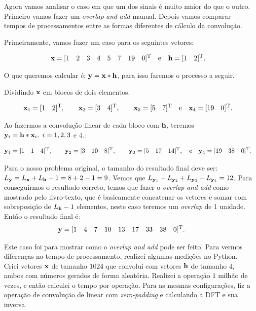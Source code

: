 \documentclass{homeworkclass}
\begin{document}
\begin{homeworkProblem}
	Agora vamos analisar o caso em que um dos sinais é muito maior do que o outro. Primeiro vamos fazer um \textit{overlap and add} manual. Depois vamos comparar tempos de processamentos entre as formas diferentes de cálculo da convolução.
	
	Primeiramente, vamos fazer um caso para os seguintes vetores:
	
	\begin{equation*}
		\mathbf{x} = [1 \quad 2 \quad 3 \quad 4 \quad 5 \quad 7 \quad 19 \quad 0]^{\mathrm{T}} \quad \textrm{e} \quad
		\mathbf{h} = [1 \quad 2]^{\mathrm{T}}.
	\end{equation*}

    O que queremos calcular é: $\mathbf{y} = \mathbf{x} * \mathbf{h}$, para isso faremos o processo a seguir.
	
	Dividindo $\mathbf{x}$ em blocos de dois elementos.
	
	\begin{equation*}
		\mathbf{x}_1 = [1 \quad 2]^{\mathrm{T}}, \qquad
		\mathbf{x}_2 = [3 \quad 4]^{\mathrm{T}}, \qquad
		\mathbf{x}_3 = [5 \quad 7]^{\mathrm{T}} \quad \textrm{e} \quad
		\mathbf{x}_4 = [19 \quad 0]^{\mathrm{T}}.
	\end{equation*}
	
	Ao fazermos a convolução linear de cada bloco com $\mathbf{h}$, teremos $\mathbf{y}_{i} = \mathbf{h} * \mathbf{x}_{i},~i = 1, 2, 3$ e $4$.:
	
		\begin{equation*}
		\mathbf{y}_1 = [1 \quad 1 \quad 4]^{\mathrm{T}}, \qquad
		\mathbf{y}_2 = [3 \quad 10 \quad 8]^{\mathrm{T}}, \qquad
		\mathbf{y}_3 = [5 \quad 17 \quad 14]^{\mathrm{T}}, \quad \textrm{e} \quad
		\mathbf{y}_4 = [19 \quad 38 \quad 0]^{\mathrm{T}}.
	\end{equation*}

	Para o nosso problema original, o tamanho do resultado final deve ser: $L_{\mathbf{y}} = L_{\mathbf{x}} + L_{\mathbf{h}} - 1 = 8 + 2 - 1 = 9$. Vemos que $L_{\mathbf{y}_{1}} + L_{\mathbf{y}_{2}} + L_{\mathbf{y}_{3}} + L_{\mathbf{y}_{4}} = 12$. Para conseguirmos o resultado correto, temos que fazer o \textit{overlap and add} como mostrado pelo livro-texto, que é basicamente concatenar os vetores e somar com sobreposição de $L_{\mathbf{h}} - 1$ elementos, neste caso teremos um \textit{overlap} de 1 unidade.
	Então o resultado final é:
	\begin{equation*}
		\mathbf{y} = [1 \quad 4 \quad 7 \quad 10 \quad 13 \quad 17 \quad 33 \quad 38 \quad 0]^{\mathrm{T}}. \qquad
	\end{equation*}

	Este caso foi para mostrar como o \textit{overlap and add} pode ser feito. Para vermos diferenças no tempo de processamento, realizei algumas medições no Python. Criei vetores $\mathbf{x}$ de tamanho $1024$ que convoluí com vetores $\mathbf{h}$ de tamanho 4, ambos com números gerados de forma aleatória. Realizei a operação $1$ milhão de vezes, e então calculei o tempo por operação. Para as mesmas configurações, fiz a operação de convolução de linear com \textit{zero-padding} e calculando a DFT e sua inversa. 
	

\end{homeworkProblem}
\end{document}
